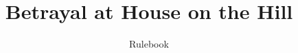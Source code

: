 \documentclass[10pt, a4paper, twocolumn]{article}
\title{Betrayal at House on the Hill}
\author{Rulebook}
\date{}
\begin{document}
\maketitle
\tableofcontents

\pagebreak




% 
% 
\end{document}
